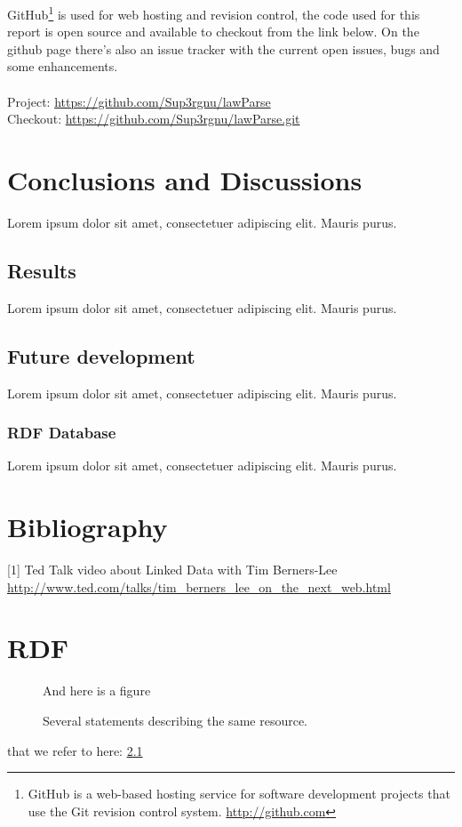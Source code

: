 \documentclass[a4paper,11pt]{kth-mag}
\begin{document}
GitHub\footnote{GitHub is a web-based hosting service for software development
projects that use the Git revision control system. \url{http://github.com}} is
used for web hosting and revision control, the code used for this report is
open source and available to checkout from the link below. On the github page
there's also an issue tracker with the current open issues, bugs and some
enhancements.\\\\
Project: \url{https://github.com/Sup3rgnu/lawParse}\\
Checkout: \url{https://github.com/Sup3rgnu/lawParse.git}

\chapter{Conclusions and Discussions}

Lorem ipsum dolor sit amet, consectetuer adipiscing elit. Mauris
purus. 

\section{Results}

Lorem ipsum dolor sit amet, consectetuer adipiscing elit. Mauris
purus. 

\section{Future development}

Lorem ipsum dolor sit amet, consectetuer adipiscing elit. Mauris
purus. 

\subsection{RDF Database}

Lorem ipsum dolor sit amet, consectetuer adipiscing elit. Mauris
purus. 

\chapter*{Bibliography}

[1] Ted Talk video about Linked Data with Tim Berners-Lee \url{http://www.ted.com/talks/tim_berners_lee_on_the_next_web.html}


\appendix
\addappheadtotoc
\chapter{RDF}\label{appA}

\begin{figure}[ht]
\begin{center}
And here is a figure
\caption{\small{Several statements describing the same resource.}}\label{RDF_4}
\end{center}
\end{figure}

that we refer to here: \ref{RDF_4}
\end{document}
